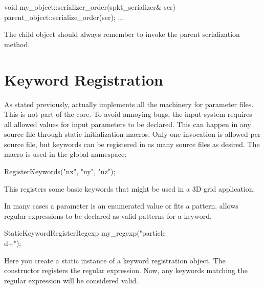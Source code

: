 \begin{CppCode}
void
my_object::serializer_order(spkt_serializer& ser)
{
  parent_object::serialize_order(ser);
  ...
}
\end{CppCode}
The child object should always remember to invoke the parent serialization method.

\section{Keyword Registration}\label{sec:keywords}
As stated previously, \sprockit actually implements all the machinery for parameter files.
This is not part of the \sstmacro core.
To avoid annoying bugs, the \sprockit input system requires all allowed values for input parameters to be declared.
This can happen in any source file through static initialization macros.
Only one invocation is allowed per source file,
but keywords can be registered in as many source files as desired.
The macro is used in the global namespace:

\begin{CppCode}
RegisterKeywords("nx", "ny", "nz");
\end{CppCode}
This registers some basic keywords that might be used in a 3D grid application.

In many cases a parameter is an enumerated value or fits a pattern.
\sprockit allows regular expressions to be declared as valid patterns for a keyword.

\begin{CppCode}
StaticKeywordRegisterRegexp my_regexp("particle\\d+");
\end{CppCode}
Here you create a static instance of a keyword registration object.
The constructor registers the regular expression.
Now, any keywords matching the regular expression will be considered valid.


